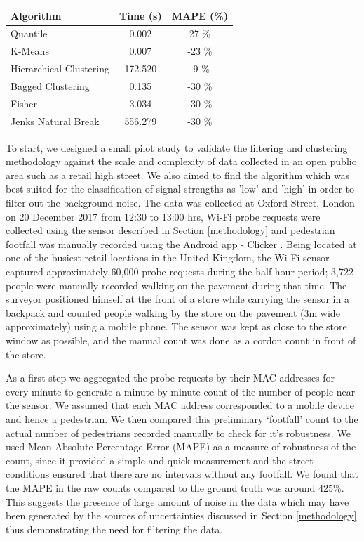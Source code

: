 \begin{table}
{\begin{tabular}{lcc} 
	\toprule
	 Algorithm					& Time (s) 	& MAPE (\%) \\
	\midrule
	 Quantile					& 0.002 	&  27 \% \\
	 K-Means			 		& 0.007 	& -23 \% \\
	 Hierarchical Clustering	& 172.520 	&  -9 \% \\
	 Bagged Clustering 			& 0.135 	& -30 \% \\
	 Fisher 					& 3.034 	& -30 \% \\
	 Jenks Natural Break 		& 556.279 	& -30 \% \\
	 \bottomrule
\end{tabular}}
\label{classification-table}
\end{table}

To start, we designed a small pilot study to validate the filtering and
clustering methodology against the scale and complexity of data collected in an
open public area such as a retail high street. We also aimed to find the
algorithm which was best suited for the classification of signal strengths as
'low' and 'high' in order to filter out the background noise. The data was
collected at Oxford Street, London on 20 December 2017 from 12:30 to 13:00 hrs,
Wi-Fi probe requests were collected using the sensor described in Section
\ref{methodology} and pedestrian footfall was manually recorded using the
Android app - Clicker \citep{bala2018clicker}. Being located at one of the
busiest retail locations in the United Kingdom, the Wi-Fi sensor captured
approximately 60,000 probe requests during the half hour period; 3,722 people
were manually recorded walking on the pavement during that time. The surveyor
positioned himself at the front of a store while carrying the sensor in a
backpack and counted people walking by the store on the pavement (3m wide
approximately) using a mobile phone. The sensor was kept as close to the store
window as possible, and the manual count was done as a cordon count in front of
the store.

As a first step we aggregated the probe requests by their MAC addresses for
every minute to generate a minute by minute count of the number of people near
the sensor. We assumed that each MAC address corresponded to a mobile device and
hence a pedestrian. We then compared this preliminary `footfall' count to the
actual number of pedestrians recorded manually to check for it's robustness. We
used Mean Absolute Percentage Error (MAPE) as a measure of robustness of the
count, since it provided a simple and quick measurement and the street
conditions ensured that there are no intervals without any footfall. We found
that the MAPE in the raw counts compared to the ground truth was around 425\%.
This suggests the presence of large amount of noise in the data which may have
been generated by the sources of uncertainties discussed in Section
\ref{methodology} thus demonstrating the need for filtering the data.

